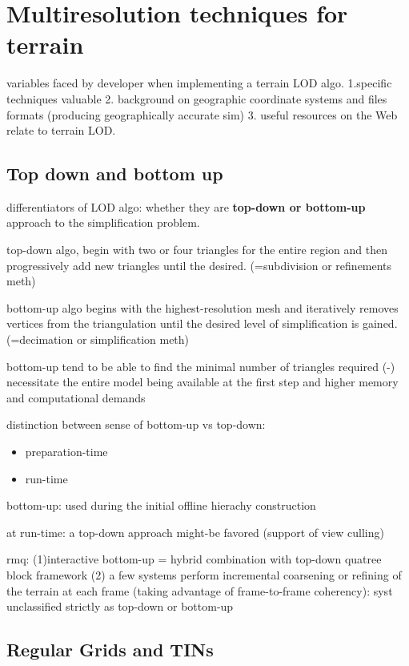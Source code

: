 \documentclass[11pt]{report}
\begin{document}
\section{Multiresolution techniques for terrain}

variables faced by developer when implementing a terrain LOD algo.
1.specific techniques valuable
2. background on geographic coordinate systems and files formats (producing geographically accurate sim)
3. useful resources on the Web relate to terrain LOD.

\subsection{Top down and bottom up}

differentiators of LOD algo: whether they are \textbf{top-down or bottom-up} approach to the simplification problem.

top-down algo, begin with two or four triangles for the entire region and then progressively add new triangles until the desired. (=subdivision or refinements meth)

bottom-up algo begins with the highest-resolution mesh and iteratively removes vertices from the triangulation until the desired level of simplification is gained. (=decimation or simplification meth)

bottom-up tend to be able to find the minimal number of triangles required (-) necessitate the entire model being available at the first step and higher memory and computational demands

distinction between sense of bottom-up vs top-down:
\begin{itemize}
\item preparation-time
\item run-time
\end{itemize}

bottom-up: used during the initial offline hierachy construction

at run-time: a top-down approach might-be favored (support of view culling)

rmq: (1)interactive bottom-up = hybrid combination with top-down quatree block framework
(2) a few systems perform incremental coarsening or refining of the terrain at each frame (taking advantage of frame-to-frame coherency): syst unclassified strictly as top-down or bottom-up

\subsection{Regular Grids and TINs}
\end{document}
